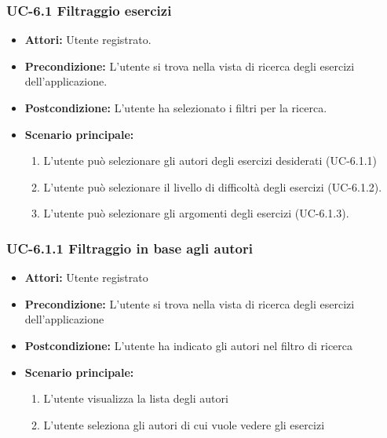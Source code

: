\subsubsection{UC-6.1 Filtraggio esercizi }
\begin{itemize}
\item \textbf{Attori:} Utente registrato.
			\item \textbf{Precondizione:} L'utente si trova nella vista di ricerca degli esercizi dell'applicazione.
			\item \textbf{Postcondizione:} L'utente ha selezionato i filtri per la ricerca.
			\item \textbf{Scenario principale:}
				\begin{enumerate}
					\item L'utente può selezionare gli autori degli esercizi desiderati (UC-6.1.1)
					\item L'utente può selezionare il livello di difficoltà degli esercizi (UC-6.1.2).
					\item L'utente può selezionare gli argomenti degli esercizi (UC-6.1.3).
				\end{enumerate}
\end{itemize}

\subsubsection{UC-6.1.1 Filtraggio in base agli autori}
	\begin{itemize}
		\item \textbf{Attori:} Utente registrato
		\item \textbf{Precondizione: } L'utente si trova nella vista di ricerca degli esercizi dell'applicazione
		\item \textbf{Postcondizione: } L'utente ha indicato gli autori nel filtro di ricerca 
		\item \textbf{Scenario principale:}
		\begin{enumerate}
			\item L'utente visualizza la lista degli autori
			\item L'utente seleziona gli autori di cui vuole vedere gli esercizi			
		\end{enumerate}
	\end{itemize}

